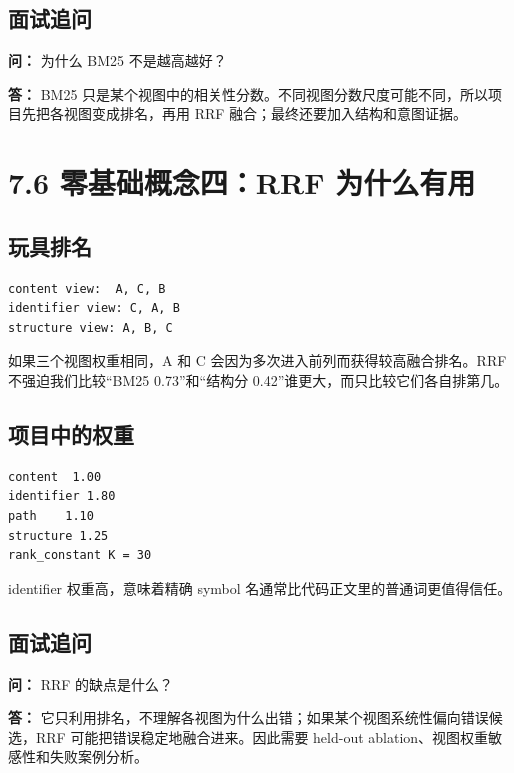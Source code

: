 \documentclass[UTF8,12pt,openany]{ctexbook}
\begin{document}
\subsection{面试追问}

\textbf{问：} 为什么 BM25 不是越高越好？\par

\textbf{答：} BM25 只是某个视图中的相关性分数。不同视图分数尺度可能不同，所以项目先把各视图变成排名，再用 RRF 融合；最终还要加入结构和意图证据。\par

\section{7.6 零基础概念四：RRF 为什么有用}

\subsection{玩具排名}

\begin{lstlisting}
content view:  A, C, B
identifier view: C, A, B
structure view: A, B, C
\end{lstlisting}

如果三个视图权重相同，A 和 C 会因为多次进入前列而获得较高融合排名。RRF 不强迫我们比较“BM25 0.73”和“结构分 0.42”谁更大，而只比较它们各自排第几。\par

\subsection{项目中的权重}

\begin{lstlisting}
content  1.00
identifier 1.80
path    1.10
structure 1.25
rank_constant K = 30
\end{lstlisting}

identifier 权重高，意味着精确 symbol 名通常比代码正文里的普通词更值得信任。\par

\subsection{面试追问}

\textbf{问：} RRF 的缺点是什么？\par

\textbf{答：} 它只利用排名，不理解各视图为什么出错；如果某个视图系统性偏向错误候选，RRF 可能把错误稳定地融合进来。因此需要 held-out ablation、视图权重敏感性和失败案例分析。\par
\end{document}
